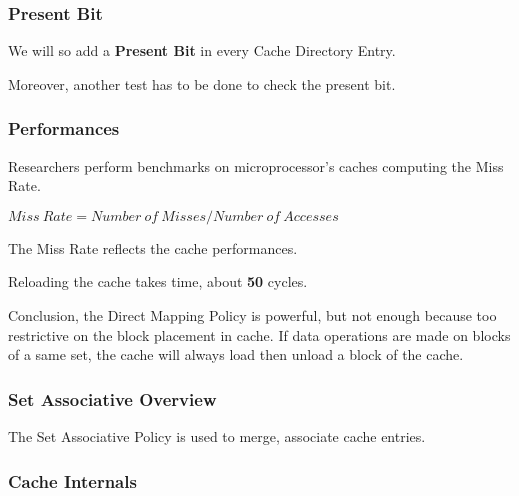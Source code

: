 
\begin{frame}
  \frametitle{Present Bit}

  We will so add a \textbf{Present Bit} in every Cache Directory Entry.

  \nl

  Moreover, another test has to be done to check the present bit.
\end{frame}


\begin{frame}[containsverbatim]
  \frametitle{Performances}

  Researchers perform benchmarks on microprocessor's caches
  computing the Miss Rate.

  \nl

  $Miss~Rate = Number~of~Misses / Number~of~Accesses$

  \nl

  The Miss Rate reflects the cache performances.

  \nl

  Reloading the cache takes time, about \textbf{50} cycles.

  \nl

  Conclusion, the Direct Mapping Policy is powerful, but not enough because
  too restrictive on the block placement in cache. If data operations
  are made on blocks of a same set, the cache will always load then unload
  a block of the cache.
\end{frame}


\begin{frame}
  \frametitle{Set Associative Overview}

  The Set Associative Policy is used to merge, associate cache entries.

  \begin{center}
  \end{center}
\end{frame}


\begin{frame}
  \frametitle{Cache Internals}

  \begin{center}
  \end{center}
\end{frame}


